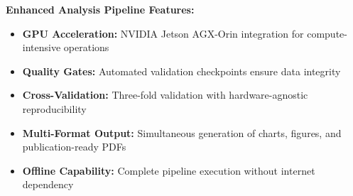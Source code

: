 \documentclass{article}
\begin{document}
\vspace{1em}

\textbf{Enhanced Analysis Pipeline Features:}
\begin{itemize}
\item \textbf{GPU Acceleration:} NVIDIA Jetson AGX-Orin integration for compute-intensive operations
\item \textbf{Quality Gates:} Automated validation checkpoints ensure data integrity
\item \textbf{Cross-Validation:} Three-fold validation with hardware-agnostic reproducibility  
\item \textbf{Multi-Format Output:} Simultaneous generation of charts, figures, and publication-ready PDFs
\item \textbf{Offline Capability:} Complete pipeline execution without internet dependency
\end{itemize}
\end{document}
